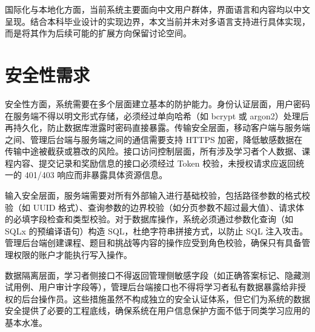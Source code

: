 国际化与本地化方面，当前系统主要面向中文用户群体，界面语言和内容均以中文呈现。结合本科毕业设计的实现边界，本文当前并未对多语言支持进行具体实现，而是将其作为后续可能的扩展方向保留讨论空间。

\section{安全性需求}

安全性方面，系统需要在多个层面建立基本的防护能力。身份认证层面，用户密码在服务端不得以明文形式存储，必须经过单向哈希（如 bcrypt 或 argon2）处理后再持久化，防止数据库泄露时密码直接暴露。传输安全层面，移动客户端与服务端之间、管理后台端与服务端之间的通信需要支持 HTTPS 加密，降低敏感数据在传输中途被截获或篡改的风险。接口访问控制层面，所有涉及学习者个人数据、课程内容、提交记录和奖励信息的接口必须经过 Token 校验，未授权请求应返回统一的 401/403 响应而非暴露具体资源信息。

输入安全层面，服务端需要对所有外部输入进行基础校验，包括路径参数的格式校验（如 UUID 格式）、查询参数的边界校验（如分页参数不超过最大值）、请求体的必填字段检查和类型校验。对于数据库操作，系统必须通过参数化查询（如 SQLx 的预编译语句）构造 SQL，杜绝字符串拼接方式，以防止 SQL 注入攻击。管理后台端创建课程、题目和挑战等内容的操作应受到角色校验，确保只有具备管理权限的账户才能执行写入操作。

数据隔离层面，学习者侧接口不得返回管理侧敏感字段（如正确答案标记、隐藏测试用例、用户审计字段等），管理后台端接口也不得将学习者私有数据暴露给非授权的后台操作员。这些措施虽然不构成独立的安全认证体系，但它们为系统的数据安全提供了必要的工程底线，确保系统在用户信息保护方面不低于同类学习应用的基本水准。
